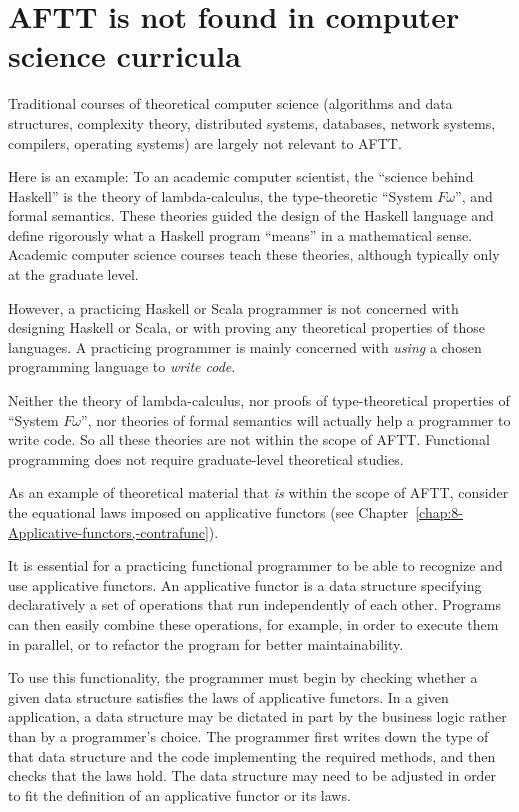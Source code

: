 \section{AFTT is not found in computer science curricula}

Traditional courses of theoretical computer science (algorithms and
data structures, complexity theory, distributed systems, databases,
network systems, compilers, operating systems) are largely not relevant
to AFTT.

Here is an example: To an academic computer scientist, the ``science
behind Haskell'' is the theory of lambda-calculus, the type-theoretic
``System $F\omega$'', and formal semantics. These theories guided
the design of the Haskell language and define rigorously what a Haskell
program ``means'' in a mathematical sense. Academic computer science
courses teach these theories, although typically only at the graduate
level. 

However, a practicing Haskell or Scala programmer is not concerned
with designing Haskell or Scala, or with proving any theoretical properties
of those languages. A practicing programmer is mainly concerned with
\emph{using} a chosen programming language to \emph{write code}. 

Neither the theory of lambda-calculus, nor proofs of type-theoretical
properties of ``System $F\omega$'', nor theories of formal semantics
will actually help a programmer to write code. So all these theories
are not within the scope of AFTT. Functional programming does not
require graduate-level theoretical studies.

As an example of theoretical material that \emph{is} within the scope
of AFTT, consider the equational laws imposed on applicative functors
(see Chapter~\ref{chap:8-Applicative-functors,-contrafunc}). 

It is essential for a practicing functional programmer to be able
to recognize and use applicative functors. An applicative functor
is a data structure specifying declaratively a set of operations that
run independently of each other. Programs can then easily combine
these operations, for example, in order to execute them in parallel,
or to refactor the program for better maintainability.

To use this functionality, the programmer must begin by checking whether
a given data structure satisfies the laws of applicative functors.
In a given application, a data structure may be dictated in part by
the business logic rather than by a programmer's choice. The programmer
first writes down the type of that data structure and the code implementing
the required methods, and then checks that the laws hold. The data
structure may need to be adjusted in order to fit the definition of
an applicative functor or its laws.

